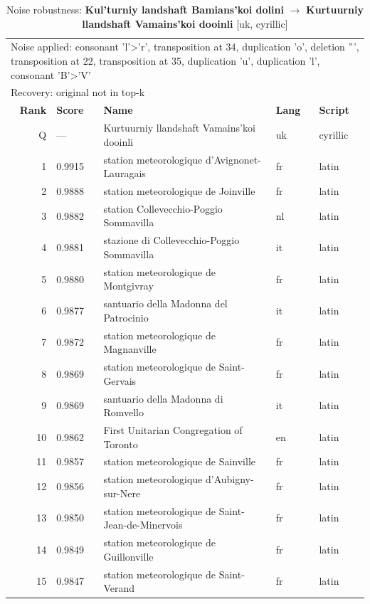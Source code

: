 \begin{table}[htbp]
\centering
\small
\caption{Noise robustness: \textbf{Kul'turniy landshaft Bamians'koi dolini} $\rightarrow$ \textbf{Kurtuurniy llandshaft Vamains'koi dooinli} [uk, cyrillic]}
\label{tab:noise-10}
\begin{tabular}{rllll}
\toprule
\multicolumn{5}{l}{\small Noise applied: consonant 'l'>'r', transposition at 34, duplication 'o', deletion ''', transposition at 22, transposition at 35, duplication 'u', duplication 'l', consonant 'B'>'V'} \\
\multicolumn{5}{l}{\small Recovery: original not in top-k} \\
\midrule
\textbf{Rank} & \textbf{Score} & \textbf{Name} & \textbf{Lang} & \textbf{Script} \\
\midrule
\rowcolor{gray!20} Q & --- & Kurtuurniy llandshaft Vamains'koi dooinli & uk & cyrillic \\
\midrule
1 & 0.9915 & station meteorologique d'Avignonet-Lauragais & fr & latin \\
2 & 0.9888 & station meteorologique de Joinville & fr & latin \\
3 & 0.9882 & station Collevecchio-Poggio Sommavilla & nl & latin \\
4 & 0.9881 & stazione di Collevecchio-Poggio Sommavilla & it & latin \\
5 & 0.9880 & station meteorologique de Montgivray & fr & latin \\
6 & 0.9877 & santuario della Madonna del Patrocinio & it & latin \\
7 & 0.9872 & station meteorologique de Magnanville & fr & latin \\
8 & 0.9869 & station meteorologique de Saint-Gervais & fr & latin \\
9 & 0.9869 & santuario della Madonna di Romvello & it & latin \\
10 & 0.9862 & First Unitarian Congregation of Toronto & en & latin \\
11 & 0.9857 & station meteorologique de Sainville & fr & latin \\
12 & 0.9856 & station meteorologique d'Aubigny-sur-Nere & fr & latin \\
13 & 0.9850 & station meteorologique de Saint-Jean-de-Minervois & fr & latin \\
14 & 0.9849 & station meteorologique de Guillonville & fr & latin \\
15 & 0.9847 & station meteorologique de Saint-Verand & fr & latin \\
\bottomrule
\end{tabular}
\end{table}

